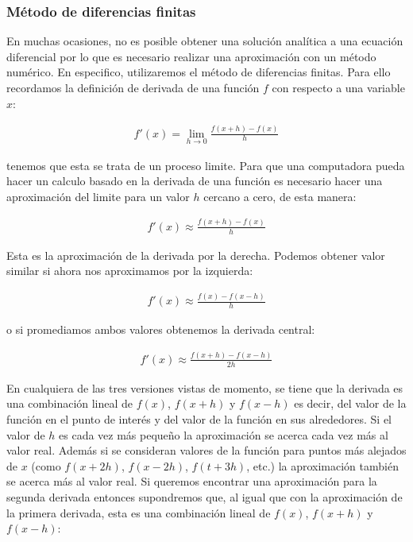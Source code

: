 \documentclass[12pt]{article}
\begin{document}
\subsubsection{Método de diferencias finitas}

En muchas ocasiones, no es posible obtener una solución analítica a una ecuación diferencial por lo que es necesario realizar una aproximación con un método numérico. En especifico, utilizaremos el método de diferencias finitas. Para ello recordamos la definición de derivada de una función $f$ con respecto a una variable $x$:

\begin{align*}
    f'(x) = \lim_{h\rightarrow 0}\frac{f(x+h)-f(x)}{h}
\end{align*}

tenemos que esta se trata de un proceso limite. Para que una computadora pueda hacer un calculo basado en la derivada de una función es necesario hacer una aproximación del limite para un valor $h$ cercano a cero, de esta manera:

\begin{align*}
    f'(x) \approx\frac{f(x+h)-f(x)}{h}
\end{align*}

Esta es la aproximación de la derivada por la derecha. Podemos obtener valor similar si ahora nos aproximamos por la izquierda:

\begin{align*}
    f'(x) \approx\frac{f(x)-f(x-h)}{h}
\end{align*}

o si promediamos ambos valores obtenemos la derivada central:

\begin{align*}
    f'(x) \approx\frac{f(x+h)-f(x-h)}{2h}
\end{align*}

En cualquiera de las tres versiones vistas de momento, se tiene que la derivada es una combinación lineal de $f(x)$, $f(x+h)$ y $f(x-h)$ es decir, del valor de la función en el punto de interés y del valor de la función en sus alrededores. Si el valor de $h$ es cada vez más pequeño la aproximación se acerca cada vez más al valor real. Además si se consideran valores de la función para puntos más alejados de $x$ (como $f(x+2h)$, $f(x-2h)$, $f(t+3h)$, etc.) la aproximación también se acerca más al valor real. Si queremos encontrar una aproximación para la segunda derivada entonces supondremos que, al igual que con la aproximación de la primera derivada,  esta es una combinación lineal de $f(x)$, $f(x+h)$ y $f(x-h)$:
\end{document}
